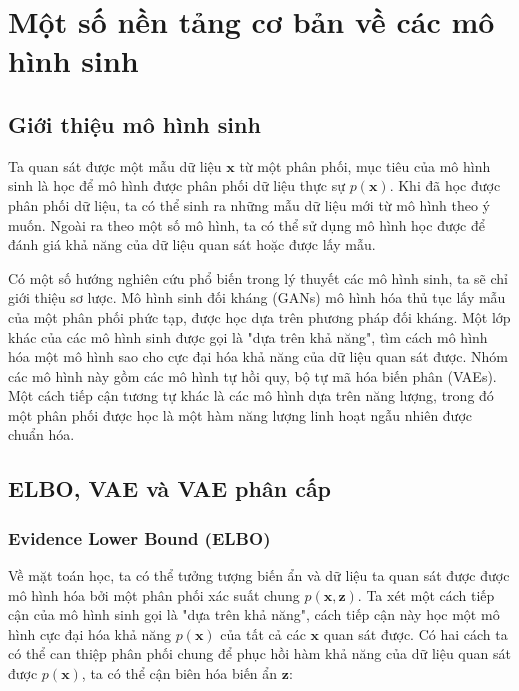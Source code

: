 \documentclass[14pt, a4paper]{article}
\numberwithin{equation}{section}
\numberwithin{figure}{section}
\numberwithin{dl}{section}
\numberwithin{md}{section}
\numberwithin{bd}{section}
\numberwithin{dn}{section}
\numberwithin{hq}{section}
\begin{document}
    \section{Một số nền tảng cơ bản về các mô hình sinh} \label{Section:Generative-Models-Introduction}

    \subsection{Giới thiệu mô hình sinh}

    Ta quan sát được một mẫu dữ liệu $\boldsymbol{x}$ từ một phân phối, mục tiêu của mô hình sinh là học để mô hình được phân phối dữ liệu thực sự $p(\boldsymbol{x})$.
    Khi đã học được phân phối dữ liệu, ta có thể sinh ra những mẫu dữ liệu mới từ mô hình theo ý muốn.
    Ngoài ra theo một số mô hình, ta có thể sử dụng mô hình học được để đánh giá khả năng của dữ liệu quan sát hoặc được lấy mẫu.

    Có một số hướng nghiên cứu phổ biến trong lý thuyết các mô hình sinh, ta sẽ chỉ giới thiệu sơ lược.
    Mô hình sinh đối kháng (GANs) mô hình hóa thủ tục lấy mẫu của một phân phối phức tạp, được học dựa trên phương pháp đối kháng.
    Một lớp khác của các mô hình sinh được gọi là "dựa trên khả năng", tìm cách mô hình hóa một mô hình sao cho cực đại hóa khả năng của dữ liệu quan sát được.
    Nhóm các mô hình này gồm các mô hình tự hồi quy, bộ tự mã hóa biến phân (VAEs).
    Một cách tiếp cận tương tự khác là các mô hình dựa trên năng lượng, trong đó một phân phối được học là một hàm năng lượng linh hoạt ngẫu nhiên được chuẩn hóa.

    \subsection{ELBO, VAE và VAE phân cấp}

    \subsubsection{Evidence Lower Bound (ELBO)}

    Về mặt toán học, ta có thể tưởng tượng biến ẩn và dữ liệu ta quan sát được được mô hình hóa bởi một phân phối xác suất chung $p(\boldsymbol{x}, \boldsymbol{z})$.
    Ta xét một cách tiếp cận của mô hình sinh gọi là "dựa trên khả năng", cách tiếp cận này học một mô hình cực đại hóa khả năng $p(\boldsymbol{x})$ của tất cả các $\boldsymbol{x}$ quan sát được.
    Có hai cách ta có thể can thiệp phân phối chung để phục hồi hàm khả năng của dữ liệu quan sát được $p(\boldsymbol{x})$, ta có thể cận biên hóa biến ẩn $\boldsymbol{z}$:
\end{document}

